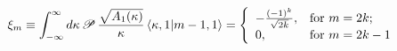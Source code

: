 \begin{equation}
\xi_m\equiv\int_{-\infty}^{\infty}d\kappa\,\mathscr{P}\,\frac{\sqrt{A_1(\kappa)}}{\kappa}\,
\langle\kappa,1|m-1,1\rangle
=\left\{%
\begin{array}{ll}
    -\frac{(-1)^k}{\sqrt{2k}}, & \hbox{for } m=2k;\\
    0, & \hbox{for } m=2k-1 \\
\end{array}%
\right.
\label{xim}
\end{equation}

